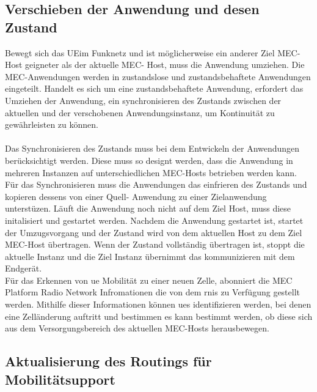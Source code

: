 \documentclass[runningheads]{llncs}
\numberwithin{figure}{section}
\begin{document}
\subsection{Verschieben der Anwendung und desen Zustand}
Bewegt sich das \acrshort{UE}im Funknetz und ist möglicherweise ein anderer Ziel MEC-Host geigneter als der aktuelle
MEC- Host, muss die Anwendung umziehen. Die MEC-Anwendungen werden in zustandslose und zustandsbehaftete Anwendungen eingeteilt.
Handelt es sich um eine zustandsbehaftete Anwendung, 
erfordert das Umziehen der Anwendung, ein synchronisieren des Zustands zwischen der aktuellen und der
verschobenen Anwendungsinstanz, um Kontinuität zu gewährleisten zu können.
\\
\\
Das Synchronisieren des Zustands muss bei dem Entwickeln der Anwendungen berücksichtigt werden. Diese muss so designt werden, 
dass die Anwendung in mehreren Instanzen auf unterschiedlichen MEC-Hosts betrieben werden kann. 
Für das Synchronisieren muss die Anwendungen das einfrieren des Zustands und kopieren dessens von einer Quell- Anwendung 
zu einer Zielanwendung unterstüzen. 
Läuft die Anwendung noch nicht auf dem Ziel Host, muss diese initalisiert und gestartet werden.
Nachdem die Anwendung gestartet ist, startet der Umzugsvorgang und der Zustand wird von dem aktuellen 
Host zu dem Ziel MEC-Host übertragen. Wenn der Zustand vollständig übertragen ist, stoppt die aktuelle Instanz
und die Ziel Instanz übernimmt das kommunizieren mit dem Endgerät.
\\
Für das Erkennen von \acrshort{ue} Mobilität zu einer neuen Zelle, abonniert die MEC Platform Radio Network Infromationen die von dem \acrfull{rnis} zu
Verfügung gestellt werden. Mithilfe dieser Informationen können \acrshort{ue}s identifizieren werden, bei denen eine Zelländerung auftritt 
und bestimmen es kann bestimmt werden, ob diese sich aus dem Versorgungsbereich des aktuellen MEC-Hosts herausbewegen.
\subsection{Aktualisierung des Routings für Mobilitätsupport}
\end{document}
